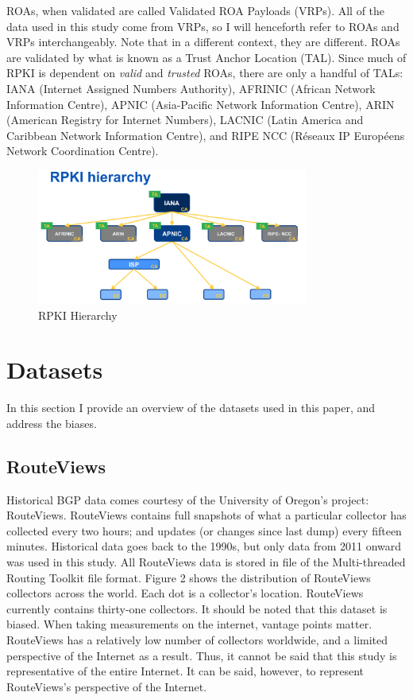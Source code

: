 ROAs, when validated are called Validated ROA Payloads (VRPs). All of the data
used in this study come from VRPs, so I will henceforth refer to ROAs and VRPs
interchangeably. Note that in a different context, they are different. ROAs are
validated by what is known as a Trust Anchor Location (TAL). Since much of RPKI
is dependent on {\em valid} and {\em trusted} ROAs, there are only a handful
of TALs: IANA (Internet Assigned Numbers Authority), AFRINIC (African Network
Information Centre), APNIC (Asia-Pacific Network Information Centre), ARIN
(American Registry for Internet Numbers), LACNIC (Latin America and Caribbean
Network Information Centre), and RIPE NCC (Réseaux IP Européens Network
Coordination Centre).

\begin{figure}[tp]
    \begin{center}
        \includegraphics[width=\textwidth, height=1.75in, keepaspectratio]{figures/rpki-hierarchy.png}
    \end{center}
    \caption{RPKI Hierarchy \cite{rpki-hierarchy}}
\end{figure}

\section{Datasets}
In this section I provide an overview of the datasets used in this paper, and
address the biases.

\subsection{RouteViews}
Historical BGP data comes courtesy of the University of Oregon's project:
RouteViews. RouteViews contains full snapshots of what a particular collector
has collected every two hours; and updates (or changes since last dump) every
fifteen minutes. Historical data goes back to the 1990s, but only data from 2011
onward was used in this study. All RouteViews data is stored in file of the
Multi-threaded Routing Toolkit file format\cite{mrt-rfc}. Figure 2 shows the
distribution of RouteViews collectors across the world. Each dot is a
collector's location. RouteViews currently contains thirty-one collectors. It
should be noted that this dataset is biased.  When taking measurements on the
internet, vantage points matter. RouteViews has a relatively low number of
collectors worldwide, and a limited perspective of the Internet as a result.
Thus, it cannot be said that this study is representative of the entire
Internet. It can be said, however, to represent RouteViews's perspective of the
Internet.

